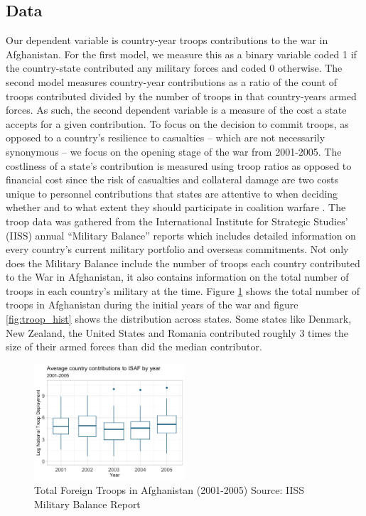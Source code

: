 \documentclass[12pt,letterpaper]{article}
\begin{document}
	\subsection{Data}
		Our dependent variable is country-year troops contributions to the war in Afghanistan. For the first model, we measure this as a binary variable coded 1 if the country-state contributed any military forces and coded 0 otherwise. The second model measures country-year contributions as a ratio of the count of troops contributed divided by the number of troops in that country-years armed forces. As such, the second dependent variable is a measure of the cost a state accepts for a given contribution. To focus on the decision to commit troops, as opposed to a country's resilience to casualties -- which are not necessarily synonymous -- we focus on the opening stage of the war from 2001-2005. The costliness of a state's contribution is measured using troop ratios as opposed to financial cost since the risk of casualties and collateral damage are two costs unique to personnel contributions that states are attentive to when deciding whether and to what extent they should participate in coalition warfare \citep{ringsmose_natoburdensharingredux_2010, chivvis_topplingqaddafilibya_2014, haesebrouck_natoburdensharing_2017}. The troop data was gathered from the International Institute for Strategic Studies' (IISS) annual ``Military Balance'' reports \citep{internationalinstituteforstrategicstudies_militarybalance_2002} which includes detailed information on every country's current military portfolio and overseas commitments. Not only does the Military Balance include the number of troops each country contributed to the War in Afghanistan, it also contains information on the total number of troops in each country's military at the time. Figure \ref{fig:afghan_total} shows the total number of troops in Afghanistan during the initial years of the war and figure \ref{fig:troop_hist} shows the distribution across states. Some states like Denmark, New Zealand, the United States and Romania contributed roughly 3 times the size of their armed forces than did the median contributor.

			\begin{figure}[H]
			\centering
				\includegraphics[width=0.5\textwidth]{figures/country_troop_boxplot.png}
			\caption{Total Foreign Troops in Afghanistan (2001-2005) Source: IISS Military Balance Report}
			\label{fig:afghan_total}
			\end{figure}
\end{document}

